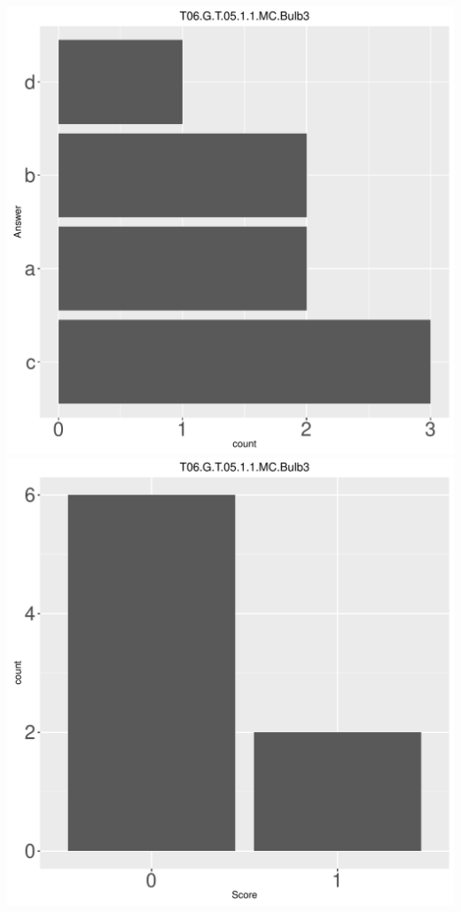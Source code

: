 \documentclass[12pt,english,nohyper]{tufte-handout}\usepackage[]{graphicx}\usepackage[]{color}
\begin{document}
\begin{center} \includegraphics[width=.45\linewidth]{Topic06_AB_81_answer} \includegraphics[width=.45\linewidth]{Topic06_AB_81_score} \end{center} 
\end{document}
